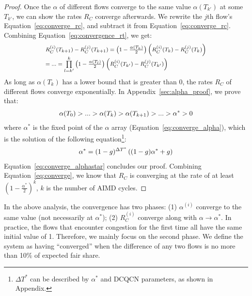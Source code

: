 \begin{proof}
Once the $\alpha$ of different flows converge to the same value $\alpha(T_{k'})$ at some $T_{k'}$, we can show 
the rates $R_C$ converge afterwards. We rewrite the $j$th flow's Equation~\ref{eq:converge_rc}, and subtract it 
from Equation~\ref{eq:converge_rc}. Combining Equation~\ref{eq:convergence_rt}, we get:
\begin{equation}
\small
\begin{array}{l}
R_C^{(i)}({T_{k + 1}}) - R_C^{(j)}({T_{k + 1}}) = \left( {1 - \frac{{\alpha ({T_k})}}{2}} \right)\left( {R_C^{(i)}({T_k}) - R_C^{(j)}({T_k})} \right)\\
 = ... = \prod\limits_{l = k'}^k {\left( {1 - \frac{{\alpha ({T_l})}}{2}} \right)} \left( {R_C^{(i)}({T_{k'}}) - R_C^{(j)}({T_{k'}})} \right)
\end{array}
\label{eq:converge}
\end{equation}
As long as $\alpha ({T_k})$ has a lower bound that is greater than 0, the rates $R_C$ of different flows 
converge exponentially. In Appendix~\ref{sec:alpha_proof}, we prove that:
\begin{equation}
\small
\alpha ({T_0}) > ... > \alpha ({T_k}) > \alpha ({T_{k + 1}}) > ... > {\alpha ^*} > 0
\label{eq:converge_alphastar}
\end{equation}
where $\alpha^{*}$ is the fixed point of the $\alpha$ array (Equation~\ref{eq:converge_alpha}),
which is the solution of the following equation\footnote{${\Delta {T^*}}$ can be described by 
$\alpha^{*}$ and DCQCN parameters, as shown in Appendix.}:
\begin{equation}
\small
{\alpha ^*} = {(1 - g)^{\Delta {T^*}}}\left( {(1 - g){\alpha ^*} + g} \right)
\end{equation}
Equation~\ref{eq:converge_alphastar} concludes our proof. Combining Equation~\ref{eq:converge}, 
we know that $R_C$ is converging at the rate of at least $( {1 - \frac{{{\alpha ^{*}}}}{2}} )^k$, 
$k$ is the number of AIMD cycles.
\end{proof}


In the above analysis, the convergence has two phases: (1) $\alpha ^{(i)}$
converge to the same value (not necessarily at $\alpha^*$); (2) $R_C^{(i)}$
converge along with $\alpha \to \alpha^*$.  In practice, the flows that
encounter congestion for the first time all have the same initial value of 1.
Therefore, we mainly focus on the second phase. We define the system as having
``converged'' when the difference of any two flows is no more than 10\% of
expected fair share.

